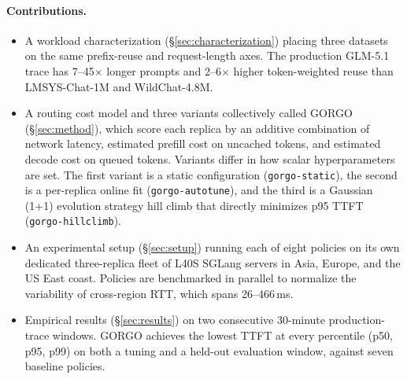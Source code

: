 \documentclass{article}
\begin{document}
\paragraph{Contributions.}
\begin{itemize}
\item A workload characterization (\S\ref{sec:characterization}) placing three
  datasets on the same prefix-reuse and request-length axes. The production
  GLM-5.1 trace has 7--45$\times$ longer prompts and 2--6$\times$ higher
  token-weighted reuse than LMSYS-Chat-1M and WildChat-4.8M.
\item A routing cost model and three variants collectively called GORGO
  (\S\ref{sec:method}), which score each replica by an additive combination of
  network latency, estimated prefill cost on uncached tokens, and estimated decode cost on queued tokens. Variants differ in how scalar hyperparameters are set. The first variant is a static configuration (\texttt{gorgo-static}), the second is a per-replica online fit (\texttt{gorgo-autotune}), and the third is a Gaussian (1+1) evolution strategy hill climb that directly minimizes p95 TTFT (\texttt{gorgo-hillclimb}). 
\item An experimental setup (\S\ref{sec:setup}) running each of eight policies
  on its own dedicated three-replica fleet of L40S SGLang servers in Asia, Europe, and the US East coast. Policies are benchmarked in parallel  to normalize the variability of cross-region RTT, which spans 26--466\,ms.
\item Empirical results (\S\ref{sec:results}) on two consecutive 30-minute
  production-trace windows. GORGO achieves the lowest TTFT at every percentile
  (p50, p95, p99) on both a tuning and a held-out evaluation window, against
  seven baseline policies.
\end{itemize}

\end{document}
